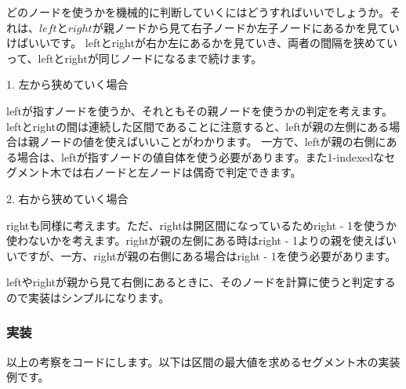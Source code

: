 \vspace{1cm}

どのノードを使うかを機械的に判断していくにはどうすればいいでしょうか。それは、$left$と$right$が親ノードから見て右子ノードか左子ノードにあるかを見ていけばいいです。
leftとrightが右か左にあるかを見ていき、両者の間隔を狭めていって、leftとrightが同じノードになるまで続けます。

1. 左から狭めていく場合

leftが指すノードを使うか、それともその親ノードを使うかの判定を考えます。leftとrightの間は連続した区間であることに注意すると、leftが親の左側にある場合は親ノードの値を使えばいいことがわかります。
一方で、leftが親の右側にある場合は、leftが指すノードの値自体を使う必要があります。また1-indexedなセグメント木では右ノードと左ノードは偶奇で判定できます。

2. 右から狭めていく場合

rightも同様に考えます。ただ、rightは開区間になっているためright - 1を使うか使わないかを考えます。rightが親の左側にある時はright - 1よりの親を使えばいいですが、一方、rightが親の右側にある場合はright - 1を使う必要があります。

leftやrightが親から見て右側にあるときに、そのノードを計算に使うと判定するので実装はシンプルになります。

\subsubsection{実装}

以上の考察をコードにします。以下は区間の最大値を求めるセグメント木の実装例です。


